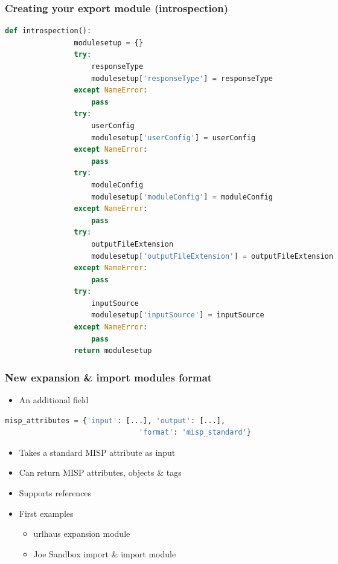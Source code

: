 \begin{frame}[fragile]
    \frametitle{Creating your export module (introspection)}
    \begin{adjustbox}{width=\textwidth,height=5cm,keepaspectratio}
        \begin{lstlisting}[language=python]
            def introspection():
                modulesetup = {}
                try:
                    responseType
                    modulesetup['responseType'] = responseType
                except NameError:
                    pass
                try:
                    userConfig
                    modulesetup['userConfig'] = userConfig
                except NameError:
                    pass
                try:
                    moduleConfig
                    modulesetup['moduleConfig'] = moduleConfig
                except NameError:
                    pass
                try:
                    outputFileExtension
                    modulesetup['outputFileExtension'] = outputFileExtension
                except NameError:
                    pass
                try:
                    inputSource
                    modulesetup['inputSource'] = inputSource
                except NameError:
                    pass
                return modulesetup
        \end{lstlisting}
    \end{adjustbox}
\end{frame}

\begin{frame}[fragile]
    \frametitle{New expansion \& import modules format}
    \begin{itemize}
        \item An additional field
    \end{itemize}
    \begin{adjustbox}{width=\textwidth,height=5cm,keepaspectratio}
        \begin{lstlisting}[language=python]
            misp_attributes = {'input': [...], 'output': [...],
                               'format': 'misp_standard'}
        \end{lstlisting}
    \end{adjustbox}
    \begin{itemize}
        \item Takes a standard MISP attribute as input
        \item Can return MISP attributes, objects \& tags
        \item Supports references
        \item First examples
            \begin{itemize}
                \item urlhaus expansion module
                \item Joe Sandbox import \& import module
            \end{itemize}
    \end{itemize}
\end{frame}

